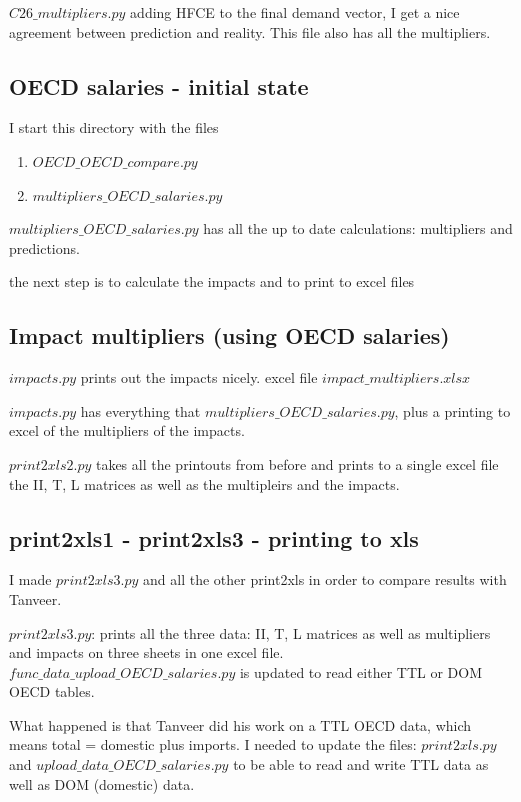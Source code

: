 \documentclass[12pt]{article}
\begin{document}
$C26\_multipliers.py$ adding HFCE to the final demand vector, I get a nice agreement between prediction and reality.
This file also has all the multipliers.


\subsection{OECD salaries - initial state}
I start this directory with the files

\begin{enumerate}
    \item $OECD\_OECD\_compare.py$
    \item $multipliers\_OECD\_salaries.py$
\end{enumerate}


$multipliers\_OECD\_salaries.py$ has all the up to date calculations: multipliers and predictions.

the next step is to calculate the impacts and to print to excel files

\subsection{Impact multipliers (using OECD salaries)}
$impacts.py$ prints out the impacts nicely. excel file $impact\_multipliers.xlsx$

$impacts.py$ has everything that $multipliers\_OECD\_salaries.py$, plus a printing to excel of the multipliers of the impacts.

$print2xls2.py$ takes all the printouts from before and prints to a single excel file the II, T, L matrices as well as the multipleirs and the impacts.


\subsection{print2xls1 - print2xls3 - printing to xls}
I made $print2xls3.py$ and all the other print2xls in order to compare results with Tanveer.

$print2xls3.py$: prints all the three data: II, T, L matrices as well as multipliers and impacts on three sheets in one excel file.
$func\_data\_upload\_OECD\_salaries.py$ is updated to read either TTL  or DOM OECD tables.

What happened is that Tanveer did his work on a TTL OECD data, which means total = domestic plus imports.
I needed to update the files: $print2xls.py$ and $upload\_data\_OECD\_salaries.py$ to be able to read and write TTL  data as well as DOM (domestic) data.  
\end{document}
